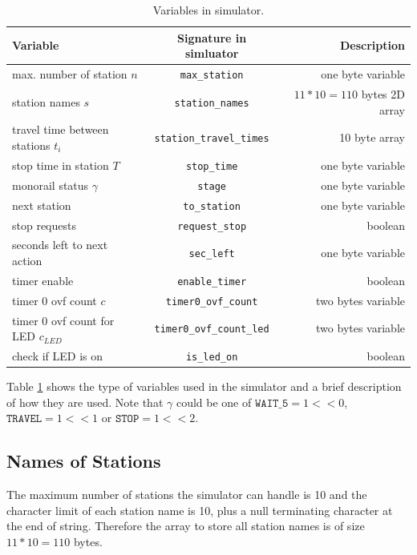 \documentclass[a4paper,12pt]{article}
\begin{document}
\begin{table}
    \centering
    \begin{tabular}{lcr}
        \toprule
        Variable & Signature in simluator & Description \\
        \midrule
         max. number of station $n$ &  \texttt{max\_station} & one byte variable \\
         station names $s$ & \texttt{station\_names} & $11 * 10=110$ bytes 2D array \\
         travel time between stations $t_i$ & \texttt{station\_travel\_times} & 10 byte array \\
         stop time in station $T$ & \texttt{stop\_time} & one byte variable \\
         monorail status $\gamma$ & \texttt{stage} & one byte variable \\
         next station & \texttt{to\_station} & one byte variable \\
         stop requests & \texttt{request\_stop} & boolean \\
         seconds left to next action & \texttt{sec\_left} & one byte variable \\
         timer enable & \texttt{enable\_timer} & boolean \\
         timer 0 ovf count $c$ & \texttt{timer0\_ovf\_count} & two bytes variable \\
         timer 0 ovf count for LED $c_{LED}$ & \texttt{timer0\_ovf\_count\_led} & two bytes variable \\
         check if LED is on & \texttt{is\_led\_on} & boolean \\
         \bottomrule
    \end{tabular}
    \caption{Variables in simulator.}
    \label{tab:variables}
\end{table}
Table \ref{tab:variables} shows the type of variables used in the simulator and a brief description of how they are used. Note that $\gamma$ could be one of $\texttt{WAIT\_5}= 1 << 0$, $\texttt{TRAVEL}= 1 << 1$ or $\texttt{STOP}= 1 << 2$.

\subsection{Names of Stations}
The maximum number of stations the simulator can handle is 10 and the character limit of each station name is 10, plus a null terminating character at the end of string. Therefore the array to store all station names is of size $11 * 10 = 110$ bytes.
\end{document}
